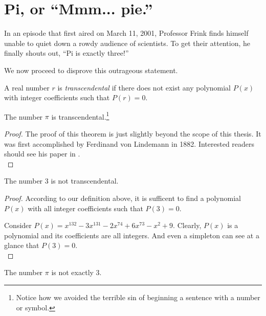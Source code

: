 \chapter{Pi, or ``Mmm... pie.''}

In an episode that first aired on March 11, 2001, Professor Frink finds 
himself unable to quiet down a rowdy audience of scientists. To
get their attention, he finally shouts out, ``Pi is exactly three!''

We now proceed to disprove this outrageous statement.\\

\begin{dfn}
A real number $r$ is \emph{transcendental} if there does not exist
any polynomial $P(x)$ with integer coefficients such that $P(r)=0$.\\
\end{dfn}

\begin{thm}\label{transcendentalpi} 
The number $\pi$ is transcendental.\footnote{Notice how we avoided
the terrible sin of beginning a sentence with a number or symbol.}
\end{thm}

\begin{proof}
The proof of this theorem is just slightly beyond the scope of this 
thesis. It was first accomplished by Ferdinand von Lindemann 
in 1882. Interested readers should see his paper in \cite{FL1882}.\\
\end{proof}

\begin{thm}\label{3nottrans}
The number 3 is not transcendental.
\end{thm}

\begin{proof}
According to our definition above, it is sufficent to find a polynomial
$P(x)$ with all integer coefficients such that $P(3)=0$. 

Consider $P(x)=x^{132}-3x^{131}-2x^{74}+6x^{73}-x^2+9$. Clearly, $P(x)$ 
is a polynomial and its coefficients are all integers. And even a 
simpleton can see at a glance that $P(3)=0$.\\
\end{proof}

\begin{cor}
The number $\pi$ is not exactly 3.
\end{cor}

